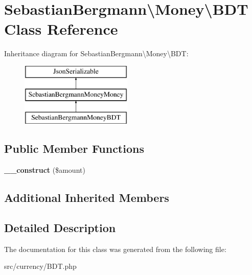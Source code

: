 \hypertarget{classSebastianBergmann_1_1Money_1_1BDT}{}\section{Sebastian\+Bergmann\textbackslash{}Money\textbackslash{}B\+D\+T Class Reference}
\label{classSebastianBergmann_1_1Money_1_1BDT}
Inheritance diagram for Sebastian\+Bergmann\textbackslash{}Money\textbackslash{}B\+D\+T\+:\begin{figure}[H]
\begin{center}
\leavevmode
\includegraphics[height=3.000000cm]{classSebastianBergmann_1_1Money_1_1BDT}
\end{center}
\end{figure}
\subsection*{Public Member Functions}
\begin{DoxyCompactItemize}
\item 
\hypertarget{classSebastianBergmann_1_1Money_1_1BDT_a46d8406e4990ef9d210aef3e3c01d1be}{}{\bfseries \+\_\+\+\_\+construct} (\$amount)\label{classSebastianBergmann_1_1Money_1_1BDT_a46d8406e4990ef9d210aef3e3c01d1be}

\end{DoxyCompactItemize}
\subsection*{Additional Inherited Members}


\subsection{Detailed Description}


The documentation for this class was generated from the following file\+:\begin{DoxyCompactItemize}
\item 
src/currency/B\+D\+T.\+php\end{DoxyCompactItemize}
